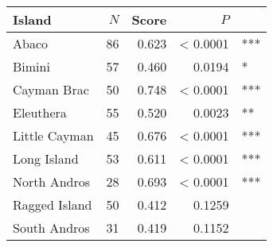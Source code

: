 
\begin{tabular}{lrrrl}
\toprule
Island & $N$ & Score & $P$ & \\
\midrule
Abaco & 86 & 0.623 & < 0.0001 & ***\\
Bimini & 57 & 0.460 & 0.0194 & *\\
Cayman Brac & 50 & 0.748 & < 0.0001 & ***\\
Eleuthera & 55 & 0.520 & 0.0023 & **\\
Little Cayman & 45 & 0.676 & < 0.0001 & ***\\
Long Island & 53 & 0.611 & < 0.0001 & ***\\
North Andros & 28 & 0.693 & < 0.0001 & ***\\
Ragged Island & 50 & 0.412 & 0.1259 & \\
South Andros & 31 & 0.419 & 0.1152 & \\
\bottomrule
\end{tabular}